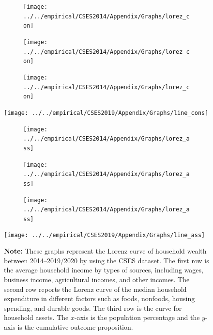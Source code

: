 \documentclass[11pt,letterpaper]{article}
\begin{document}
\begin{figure}
	\begin{subfigure}{.33\textwidth}
		\centering
		\texttt{[image: ../../empirical/CSES2014/Appendix/Graphs/lorez\_con]} 	
		
	\end{subfigure}
	\begin{subfigure}{.33\textwidth}
		\centering
		\texttt{[image: ../../empirical/CSES2014/Appendix/Graphs/lorez\_con]} 	
	\end{subfigure}
	\begin{subfigure}{.33\textwidth}
		\centering
		\texttt{[image: ../../empirical/CSES2014/Appendix/Graphs/lorez\_con]} 	
		
	\end{subfigure}
	\texttt{[image: ../../empirical/CSES2019/Appendix/Graphs/line\_cons]} \vspace{-3em}
	\newline
	
	\begin{subfigure}{.33\textwidth}
		\centering
		\texttt{[image: ../../empirical/CSES2014/Appendix/Graphs/lorez\_ass]} 		
		
	\end{subfigure}
	\begin{subfigure}{.33\textwidth}
		\centering
		\texttt{[image: ../../empirical/CSES2014/Appendix/Graphs/lorez\_ass]} 		
	\end{subfigure}
	\begin{subfigure}{.33\textwidth}
		\centering
		\texttt{[image: ../../empirical/CSES2014/Appendix/Graphs/lorez\_ass]} 		
	\end{subfigure}
	\texttt{[image: ../../empirical/CSES2019/Appendix/Graphs/line\_ass]} 		
	
	\begin{tablenotes}
		\footnotesize
		\item \textbf{Note:} These graphs represent the Lorenz curve of household wealth between 2014--2019/2020 by using the CSES dataset. The first row is the average household income by types of sources, including wages, business income, agricultural incomes, and other incomes. The second row reports the Lorenz curve of the median household expenditure in different factors such as foods, nonfoods, housing spending, and durable goods. The third row is the curve for household assets. The $x$-axis is the population percentage and the $y$-axis is the cumulative outcome proposition.  
		
	\end{tablenotes} 
\end{figure}
\end{document}
